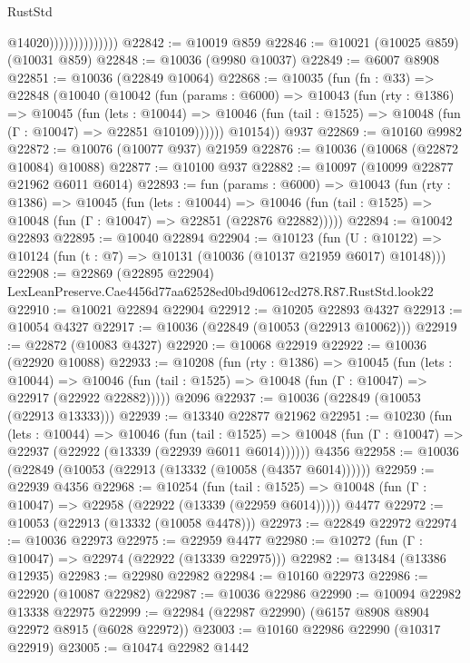 \begin{lexlean}{RustStd}
\begin{coremodule}
{{                                @14020))))))))))))))
@22842 := @10019 @859
@22846 := @10021 (@10025 @859) (@10031 @859)
@22848 := @10036 (@9980 @10037)
@22849 := @6007 @8908
@22851 := @10036 (@22849 @10064)
@22868 := @10035
    (fun (fn : @33) =>
    @22848
      (@10040
        (@10042
          (fun (params : @6000) =>
          @10043
            (fun (rty : @1386) =>
            @10045
              (fun (lets : @10044) =>
              @10046 (fun (tail : @1525) => @10048 (fun (Γ : @10047) => @22851 @10109))))))
        @10154))
    @937
@22869 := @10160 @9982
@22872 := @10076 (@10077 @937) @21959
@22876 := @10036 (@10068 (@22872 @10084) @10088)
@22877 := @10100 @937
@22882 := @10097 (@10099 @22877 @21962 @6011 @6014)
@22893 := fun (params : @6000) =>
  @10043
    (fun (rty : @1386) =>
    @10045
      (fun (lets : @10044) =>
      @10046 (fun (tail : @1525) => @10048 (fun (Γ : @10047) => @22851 (@22876 @22882)))))
@22894 := @10042 @22893
@22895 := @10040 @22894
@22904 := @10123
    (fun (U : @10122) => @10124 (fun (t : @7) => @10131 (@10036 (@10137 @21959 @6017) @10148)))
@22908 := @22869
    (@22895 @22904)
    LexLeanPreserve.Cae4456d77aa62528ed0bd9d0612cd278.R87.RustStd.look22
@22910 := @10021 @22894 @22904
@22912 := @10205 @22893 @4327
@22913 := @10054 @4327
@22917 := @10036 (@22849 (@10053 (@22913 @10062)))
@22919 := @22872 (@10083 @4327)
@22920 := @10068 @22919
@22922 := @10036 (@22920 @10088)
@22933 := @10208
    (fun (rty : @1386) =>
    @10045
      (fun (lets : @10044) =>
      @10046 (fun (tail : @1525) => @10048 (fun (Γ : @10047) => @22917 (@22922 @22882)))))
    @2096
@22937 := @10036 (@22849 (@10053 (@22913 @13333)))
@22939 := @13340 @22877 @21962
@22951 := @10230
    (fun (lets : @10044) =>
    @10046
      (fun (tail : @1525) =>
      @10048 (fun (Γ : @10047) => @22937 (@22922 (@13339 (@22939 @6011 @6014))))))
    @4356
@22958 := @10036 (@22849 (@10053 (@22913 (@13332 (@10058 (@4357 @6014))))))
@22959 := @22939 @4356
@22968 := @10254
    (fun (tail : @1525) => @10048 (fun (Γ : @10047) => @22958 (@22922 (@13339 (@22959 @6014)))))
    @4477
@22972 := @10053 (@22913 (@13332 (@10058 @4478)))
@22973 := @22849 @22972
@22974 := @10036 @22973
@22975 := @22959 @4477
@22980 := @10272 (fun (Γ : @10047) => @22974 (@22922 (@13339 @22975)))
@22982 := @13484 (@13386 @12935)
@22983 := @22980 @22982
@22984 := @10160 @22973
@22986 := @22920 (@10087 @22982)
@22987 := @10036 @22986
@22990 := @10094 @22982 @13338 @22975
@22999 := @22984 (@22987 @22990) (@6157 @8908 @8904 @22972 @8915 (@6028 @22972))
@23003 := @10160 @22986 @22990 (@10317 @22919)
@23005 := @10474 @22982 @1442
}}
\end{coremodule}
\end{lexlean}
